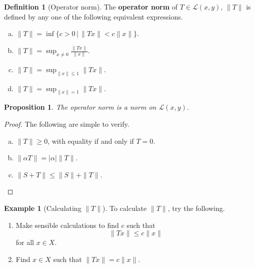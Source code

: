 \documentclass[justified]{tufte-book}
\theoremstyle{plain}%
\newtheorem{prop}[thm]{Proposition}
\theoremstyle{definition}
\newtheorem{defn}[thm]{Definition}
\newtheorem{exmp}[thm]{Example}
\theoremstyle{remark}
\newtheorem*{rem}{Remark}
\begin{document}
\begin{defn}[Operator norm]
  The \textbf{operator norm} of $T \in \mathcal{L}(x,y)$, $\| T\|$ is defined by any one of the following equivalent expressions.
  \begin{enumerate}[(a)]
      \item $\|T \| = \inf \{ c > 0 \, | \, \| Tx \| < c \| x \| \}$.
      \item $\| T\| = \sup_{x \neq 0} \frac{ \|Tx \|}{\| x \|}$.
      \item $\| T \| = \sup_{ \|x \| \leq 1} \| Tx \|$.
      \item $\| T \| = \sup_{\| x \| = 1} \|T x \|$.
  \end{enumerate}
\end{defn}

\begin{prop}
  The operator norm is a norm on $\mathcal{L}(x,y)$.  
\end{prop}

\begin{proof}  The following are simple to verify.
  \begin{enumerate}[(a)]
      \item $\| T \| \geq 0$, with equality if and only if $ T = 0$. 
      \item $\| \alpha T \| = | \alpha | \|T \|$.
      \item $\| S + T \| \leq  \| S \| + \| T \|$.
  \end{enumerate}
\end{proof}

\begin{exmp}[Calculating $\| T \|$]
  To calculate $\| T \|$, try the following. 
  \begin{enumerate}[1)]
      \item Make sensible calculations to find $c$ such that \[
          \| Tx \| \leq c \| x \|
      \] for all $x \in X$.
      \item Find $x \in X$ such that $\|Tx \| = c \| x \|$.
  \end{enumerate}
\end{exmp}


\end{document}
